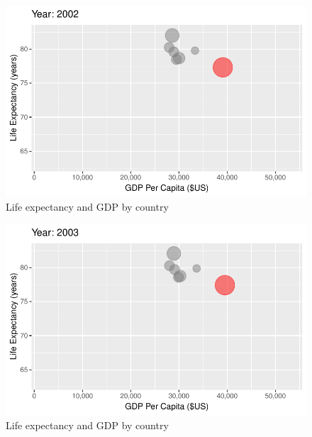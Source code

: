 \documentclass[
  letterpaper,
  DIV=11,
  numbers=noendperiod]{scrreport}
\theoremstyle{definition}
\theoremstyle{remark}
\begin{document}
\begin{figure}

{\centering \includegraphics{index_files/figure-pdf/fig-anim-country-91.pdf}

}

\caption{\label{fig-anim-country-91}Life expectancy and GDP by country}

\end{figure}

\begin{figure}

{\centering \includegraphics{index_files/figure-pdf/fig-anim-country-92.pdf}

}

\caption{\label{fig-anim-country-92}Life expectancy and GDP by country}

\end{figure}
\end{document}

